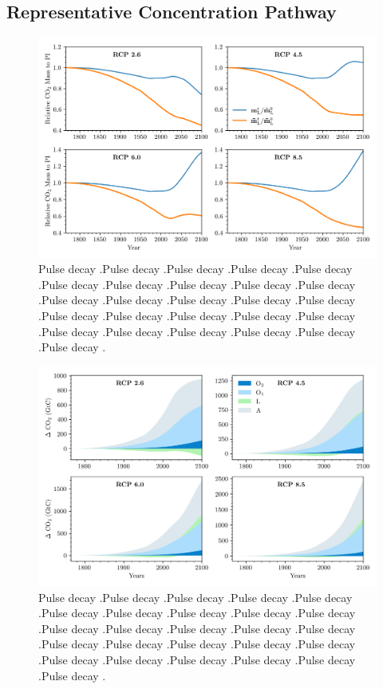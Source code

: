 \documentclass[11pt, a4paper, pdftex, twoside, dvipsnames]{article}
\begin{document}
\subsection{Representative Concentration Pathway}
 \lipsum[1]
 \lipsum[1]
%
 \begin{figure}[b]
	\includegraphics[width=\textwidth]{fig/simulations_plot_rcp_conc_land_change_base_4PR_x}
	\caption{
    Pulse decay .Pulse decay .Pulse decay .Pulse decay .Pulse decay .Pulse decay .Pulse decay .Pulse decay .Pulse decay .Pulse decay .Pulse decay .Pulse decay .Pulse decay .Pulse decay .Pulse decay .Pulse decay .Pulse decay .Pulse decay .Pulse decay .Pulse decay .Pulse decay .Pulse decay .Pulse decay .Pulse decay .Pulse decay .Pulse decay .
     }
    \label{fig:6222}
\end{figure}
%
 \lipsum[1]
 \lipsum[1]
%
%
 \begin{figure}[b]
	\includegraphics[width=\textwidth]{fig/simulations_plot_rcp_conc_comp_base_4PR_x}
	\caption{
    Pulse decay .Pulse decay .Pulse decay .Pulse decay .Pulse decay .Pulse decay .Pulse decay .Pulse decay .Pulse decay .Pulse decay .Pulse decay .Pulse decay .Pulse decay .Pulse decay .Pulse decay .Pulse decay .Pulse decay .Pulse decay .Pulse decay .Pulse decay .Pulse decay .Pulse decay .Pulse decay .Pulse decay .Pulse decay .Pulse decay .
     }
    \label{fig:6222}
\end{figure}
%
\end{document}

